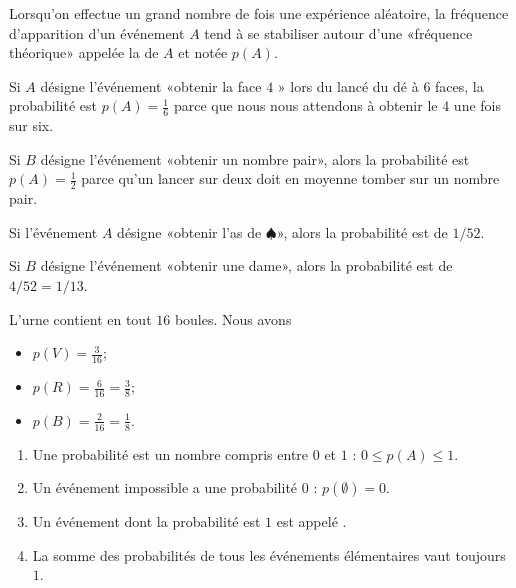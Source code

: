 \begin{definition}
    Lorsqu'on effectue un grand nombre de fois une expérience aléatoire, la fréquence d'apparition d'un événement \( A\) tend à se stabiliser autour d'une «fréquence théorique» appelée la  de \( A\) et notée \( p(A)\).
\end{definition}

\begin{example}
    Si \( A\) désigne l'événement «obtenir la face \( 4\) » lors du lancé du dé à \( 6\) faces, la probabilité est \( p(A)=\frac{1}{ 6 }\) parce que nous nous attendons à obtenir le \( 4\) une fois sur six.

    Si \( B\) désigne l'événement «obtenir un nombre pair», alors la probabilité est \( p(A)=\frac{ 1 }{2}\) parce qu'un lancer sur deux doit en moyenne tomber sur un nombre pair.
\end{example}

\begin{example}
    Si l'événement \( A\) désigne «obtenir l'as de $\spadesuit$», alors la probabilité est de \( 1/52\).
    
    Si \( B\) désigne l'événement «obtenir une dame», alors la probabilité est de \( 4/52=1/13\).
\end{example}

\begin{example}
    L'urne contient en tout \( 16\) boules. Nous avons
    \begin{itemize}
        \item \( p(V)=\frac{ 3 }{ 16 }\);
        \item
            \( p(R)=\frac{ 6 }{ 16 }=\frac{ 3 }{ 8 }\);
        \item
            \( p(B)=\frac{ 2 }{ 16 }=\frac{1}{ 8 }\).
    \end{itemize}
    
\end{example}


\begin{propriete}
    \begin{enumerate}
        \item
            Une probabilité est un nombre compris entre \( 0\) et \( 1\) : \( 0\leq p(A)\leq 1\).
        \item
            Un événement impossible a une probabilité \( 0\) : \( p(\emptyset)=0\).
        \item
            Un événement dont la probabilité est \( 1\) est appelé .
        \item
            La somme des probabilités de tous les événements élémentaires vaut toujours \( 1\).
    \end{enumerate}
\end{propriete}

